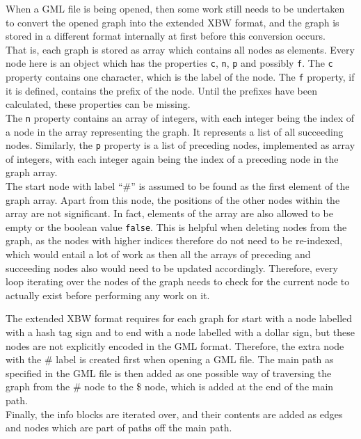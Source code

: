 \documentclass[a4paper,12pt,twoside,BCOR=10mm]{scrbook}
\begin{document}
When a GML file is being opened, then some work still needs to be undertaken 
to convert the opened graph into the extended XBW format, and the graph is stored 
in a different format internally at first before this conversion occurs. \\
That is, each graph is stored as array which contains all nodes as elements. 
Every node here is an object which has the properties \texttt{c}, \texttt{n}, \texttt{p} and 
possibly \texttt{f}. The \texttt{c} property contains one character, which is the label of the node. 
The \texttt{f} property, if it is defined, contains the prefix of the node. Until the prefixes have 
been calculated, these properties can be missing. \\
The \texttt{n} property contains an array of integers, with each integer being the index 
of a node in the array representing the graph. It represents a list of all succeeding nodes. 
Similarly, the \texttt{p} property is a list of preceding nodes, implemented as array of integers, 
with each integer again being the index of a preceding node in the graph array. \\
The start node with label “$\#$” is assumed to be found as the first element 
of the graph array. Apart from this node, the positions of the other nodes within 
the array are not significant. In fact, elements of the array are also allowed to 
be empty or the boolean value \texttt{false}. This is helpful when deleting 
nodes from the graph, as the nodes with higher indices therefore do not need to be re-indexed, 
which would entail a lot of work as then all the arrays of preceding and succeeding nodes 
also would need to be updated accordingly. 
Therefore, every loop iterating over the nodes of the graph needs to check for the 
current node to actually exist before performing any work on it.

The extended XBW format requires for each graph for start with a node labelled with a 
hash tag sign and to end with a node labelled with a dollar sign, 
but these nodes are not explicitly encoded in the GML format.
Therefore, the extra node with the $\#$ label is created first when opening a GML file. 
The main path as specified in the GML file is then added as one possible way 
of traversing the graph from the $\#$ node to the \$ node, which is added at the end of the main path. \\
Finally, the info blocks are iterated over, and their contents are added as edges and nodes which are part 
of paths off the main path.
\end{document}
